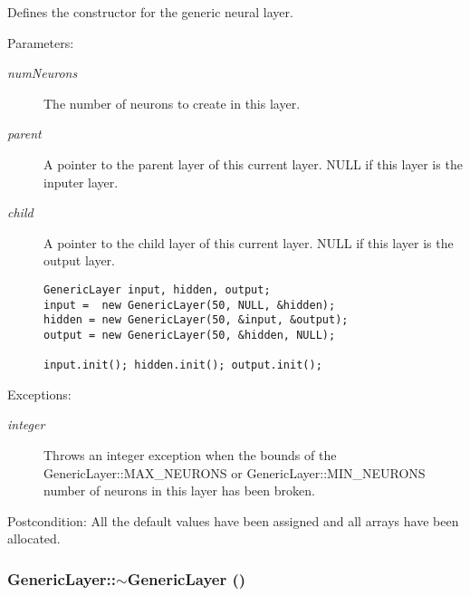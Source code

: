 Defines the constructor for the generic neural layer. \begin{Desc}
\item[Parameters:]
\begin{description}
\item[{\em numNeurons}]The number of neurons to create in this layer. \item[{\em parent}]A pointer to the parent layer of this current layer. NULL if this layer is the inputer layer. \item[{\em child}]A pointer to the child layer of this current layer. NULL if this layer is the output layer. 

\begin{DocInclude}\begin{verbatim}GenericLayer input, hidden, output;
input =  new GenericLayer(50, NULL, &hidden);
hidden = new GenericLayer(50, &input, &output);
output = new GenericLayer(50, &hidden, NULL);

input.init(); hidden.init(); output.init(); 
\end{verbatim}
\end{DocInclude}
 \end{description}
\end{Desc}
\begin{Desc}
\item[Exceptions:]
\begin{description}
\item[{\em integer}]Throws an integer exception when the bounds of the GenericLayer::MAX\_\-NEURONS or GenericLayer::MIN\_\-NEURONS number of neurons in this layer has been broken. \end{description}
\end{Desc}
\begin{Desc}
\item[Postcondition:]All the default values have been assigned and all arrays have been allocated. \end{Desc}
\hypertarget{classGenericLayer_3abc382b20bf9585dbba35bb325fff90}{
\subsubsection{\setlength{\rightskip}{0pt plus 5cm}GenericLayer::$\sim$GenericLayer ()}}
\label{classGenericLayer_3abc382b20bf9585dbba35bb325fff90}


